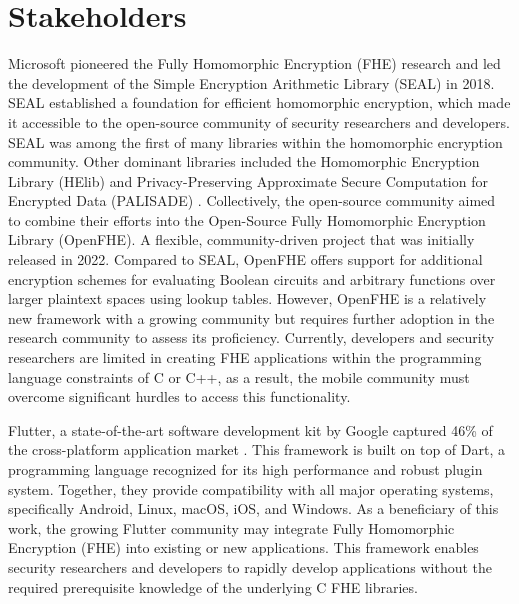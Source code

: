 \section{Stakeholders}
\label{sec:Stakeholders}
Microsoft pioneered the Fully Homomorphic Encryption (FHE) research and led the development of the Simple Encryption Arithmetic Library (SEAL) in 2018. SEAL established a foundation for efficient homomorphic encryption, which made it accessible to the open-source community of security researchers and developers. SEAL was among the first of many libraries within the homomorphic encryption community. Other dominant libraries included the Homomorphic Encryption Library (HElib) \cite{HElib} and Privacy-Preserving Approximate Secure Computation for Encrypted Data (PALISADE) \cite{PALISADE}. Collectively, the open-source community aimed to combine their efforts into the Open-Source Fully Homomorphic Encryption Library (OpenFHE). A flexible, community-driven project that was initially released in 2022. Compared to SEAL, OpenFHE offers support for additional encryption schemes for evaluating Boolean circuits and arbitrary functions over larger plaintext spaces using lookup tables. However, OpenFHE is a relatively new framework with a growing community but requires further adoption in the research community to assess its proficiency. Currently, developers and security researchers are limited in creating FHE applications within the programming language constraints of C or C++, as a result, the mobile community must overcome significant hurdles to access this functionality.

Flutter, a state-of-the-art software development kit by Google captured 46\% of the cross-platform application market \cite{vailshery-flutter-statista}. This framework is built on top of Dart, a programming language recognized for its high performance and robust plugin system. Together, they provide compatibility with all major operating systems, specifically Android, Linux, macOS, iOS, and Windows. As a beneficiary of this work, the growing Flutter community may integrate Fully Homomorphic Encryption (FHE) into existing or new applications. This framework enables security researchers and developers to rapidly develop applications without the required prerequisite knowledge of the underlying C FHE libraries.
